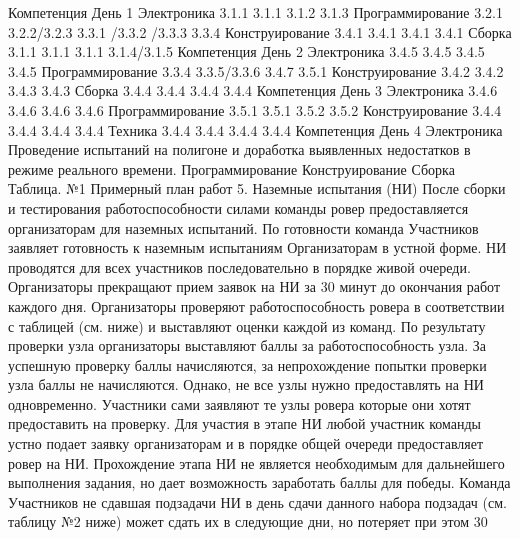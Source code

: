 \begin{table}
    \caption{Примерный план работ}
    \begin{longtable}
Компетенция	День 1
Электроника	3.1.1	3.1.1	3.1.2	3.1.3
Программирование	3.2.1	3.2.2/3.2.3	3.3.1 /3.3.2 /3.3.3	3.3.4
Конструирование	3.4.1	3.4.1	3.4.1	3.4.1
Сборка	3.1.1	3.1.1	3.1.1	3.1.4/3.1.5
Компетенция	День 2
Электроника	3.4.5	3.4.5	3.4.5	3.4.5
Программирование	3.3.4	3.3.5/3.3.6	3.4.7	3.5.1
Конструирование	3.4.2	3.4.2	3.4.3	3.4.3
Сборка	3.4.4	3.4.4 	3.4.4	3.4.4 
Компетенция	День 3
Электроника	3.4.6	3.4.6	3.4.6	3.4.6
Программирование	3.5.1	3.5.1		3.5.2		3.5.2
Конструирование	3.4.4	3.4.4	3.4.4	3.4.4
Техника	3.4.4	3.4.4	3.4.4	3.4.4
Компетенция	День 4
Электроника	Проведение испытаний на полигоне и доработка выявленных недостатков в режиме реального времени.
Программирование	
Конструирование	
Сборка	
Таблица. №1 Примерный план работ
5. Наземные испытания (НИ)
После сборки и тестирования работоспособности силами команды ровер предоставляется организаторам для наземных испытаний. По готовности команда Участников заявляет готовность к наземным испытаниям Организаторам в устной форме. НИ проводятся для всех участников последовательно в порядке живой очереди. Организаторы прекращают прием заявок на НИ за 30 минут до окончания работ каждого дня. Организаторы проверяют работоспособность ровера в соответствии с таблицей (см. ниже) и выставляют оценки каждой из команд. По результату проверки узла организаторы выставляют баллы за работоспособность узла. За успешную проверку баллы начисляются, за непрохождение попытки проверки узла баллы не начисляются. Однако, не все узлы нужно предоставлять на НИ одновременно. Участники сами заявляют те узлы ровера которые они хотят предоставить на проверку. Для участия в этапе НИ любой участник команды устно подает заявку организаторам и в порядке общей очереди предоставляет ровер на НИ. Прохождение этапа НИ не является необходимым для дальнейшего выполнения задания, но дает возможность заработать баллы для победы. Команда Участников не сдавшая подзадачи НИ в день сдачи данного набора подзадач (см. таблицу №2 ниже) может сдать их в следующие дни, но потеряет при этом 30%


\end{longtable}
\end{table}
